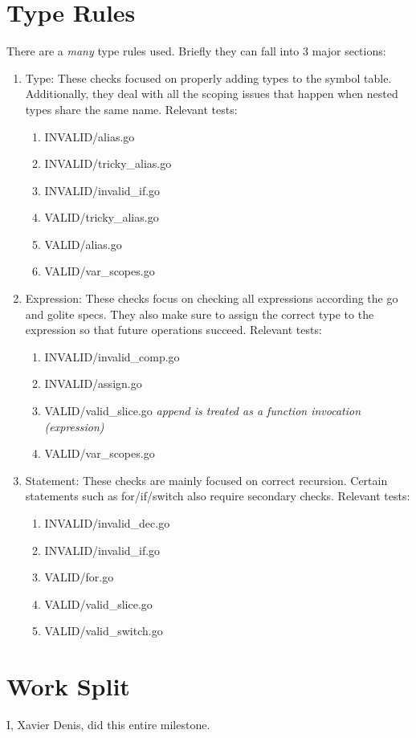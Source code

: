 \documentclass[11pt]{article}
\begin{document}
\section {Type Rules}
There are a \textit{many} type rules used. Briefly they can fall into 3 major sections:
\begin {enumerate}
  \item Type: These checks focused on properly adding types to the symbol table. Additionally, they deal with all the scoping issues that happen when nested types share the same name. Relevant tests: 
    \begin{enumerate}
      \item INVALID/alias.go
      \item INVALID/tricky\_alias.go
      \item INVALID/invalid\_if.go
      \item VALID/tricky\_alias.go
      \item VALID/alias.go
      \item VALID/var\_scopes.go
    \end{enumerate}
  \item Expression: These checks focus on checking all expressions according the go and golite specs. They also make sure to assign the correct type to the expression so that future operations succeed. Relevant tests:
    \begin{enumerate}
      \item INVALID/invalid\_comp.go
      \item INVALID/assign.go
      \item VALID/valid\_slice.go \textit{append is treated as a function invocation (expression)}
      \item VALID/var\_scopes.go
    \end{enumerate}
  \item Statement: These checks are mainly focused on correct recursion. Certain statements such as for/if/switch also require secondary checks. Relevant tests:
    \begin{enumerate}
      \item INVALID/invalid\_dec.go
      \item INVALID/invalid\_if.go
      \item VALID/for.go
      \item VALID/valid\_slice.go
      \item VALID/valid\_switch.go
    \end{enumerate}
\end {enumerate}
\section {Work Split}

I, Xavier Denis, did this entire milestone.
\end{document}

